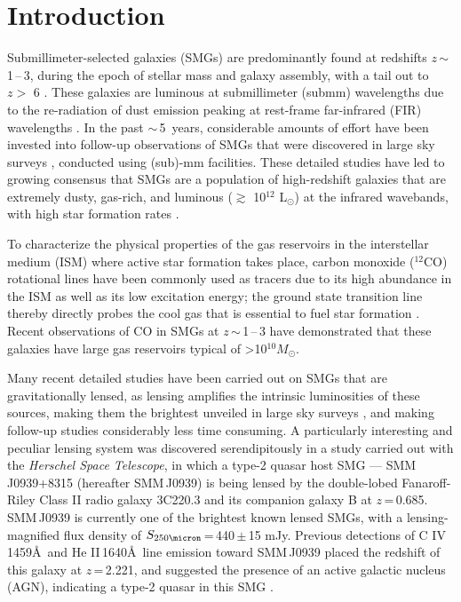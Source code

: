\documentclass[iop]{emulateapj}
\newcommand{\Msun}{\mbox{$M_{\odot}$}}
\newcommand{\Lsun}{\mbox{L$_{\odot}$}}
\newcommand{\eg}{{\sl e.g.,~}}
\newcommand{\pmOne}{\mbox{$^{-1}$}}
\begin{document}
\section{Introduction}\label{sec:intro}
Submillimeter-selected galaxies (SMGs) are predominantly found at redshifts $z$\,$\sim$\,1\,--\,3, during the epoch of stellar mass and
galaxy assembly, with a tail out to $z>$ 6 \citep{Riechers13a}.
These galaxies are luminous at submillimeter (submm) wavelengths due to the re-radiation of dust emission peaking at
rest-frame far-infrared (FIR) wavelengths \citep{blain02a}.
In the past $\sim$\,5~years, considerable amounts of effort have been invested into follow-up observations of SMGs that were
discovered in large sky surveys \citep[\eg H-ATLAS, HerMES, SPT; ][]{Eales10a,Oliver12a,Vieira10a}, conducted using (sub)-mm facilities. These detailed studies have led to growing consensus that SMGs are a population of high-redshift galaxies that are extremely dusty, gas-rich,
  and luminous ($\gtrsim$ 10$^{12}$ \Lsun) at the infrared wavebands, with high star formation rates \citep[$\gtrsim $ 500 \Msun yr\pmOne; \eg][]{Lagache05a,Casey14a}.

  To characterize the physical properties of the gas reservoirs in the interstellar medium (ISM) where active star formation takes place, carbon monoxide ($^{12}$CO) rotational lines have been commonly used as tracers due to its high abundance in the ISM as well as its low excitation energy; the ground state transition line thereby directly probes the cool gas that is essential to fuel star formation \citep[See \eg][]{Solomon05a,Carilli13a}. Recent observations of CO in SMGs at $z$\,$\sim$\,1\,--\,3 have demonstrated that these galaxies have large gas reservoirs typical of \textgreater 10$^{10}$\Msun \citep[\eg][]{Riechers11c,Riechers11d,Ivison11a,Bothwell13a}.

Many recent detailed studies have been carried out on SMGs that are gravitationally lensed,
 as lensing amplifies the intrinsic luminosities of these sources, making them the brightest unveiled in large sky surveys \citep{Negrello10a,Vieira10a,Oliver12a}, and making follow-up studies considerably less time consuming.
A particularly interesting and peculiar lensing system was discovered serendipitously in a study carried out with the {\it Herschel Space Telescope}, in which
a type-2 quasar host SMG --- SMM\,J0939+8315 (hereafter SMM\,J0939) is being lensed by the double-lobed Fanaroff-Riley
Class II \citep*[FR-II; ][]{Fanaroff74} radio galaxy 3C220.3 and its
companion galaxy B at $z$\,=\,0.685.
SMM\,J0939 is currently one of the brightest known lensed
SMGs, with a lensing-magnified flux density of $S_\textrm{250\micron}$\,=\,440\,$\pm$\,15 mJy.
Previous detections of C {\scriptsize\sc IV}\,1459\AA\
 and He {\scriptsize\sc II}\,1640\AA\ line emission toward SMM\,J0939
 placed the redshift of this galaxy at $z$\,=\,2.221, and suggested the presence of an active galactic nucleus (AGN),
indicating a type-2 quasar in this SMG \citep[hereafter H14]{Haas14}.
\end{document}
